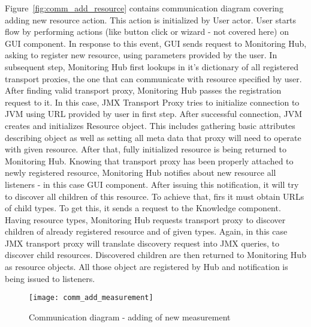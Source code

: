 Figure~\ref{fig:comm_add_resource} contains communication diagram covering adding new resource action. This action is
initialized by User actor. User starts flow by performing actions (like button click or wizard - not covered here) on
GUI component. In response to this event, GUI sends request to Monitoring Hub, asking to register new resource,
using parameters provided by the user. In subsequent step, Monitoring Hub first lookups in it's dictionary of all
registered transport proxies, the one that can communicate with resource specified by user. After finding valid
transport proxy, Monitoring Hub passes the registration request to it. In this case, JMX
Transport Proxy tries to initialize connection to JVM using URL provided by user in first step. After successful
connection, JVM creates and initializes Resource object. This includes gathering basic attributes describing object
as well as setting all meta data that proxy will need to operate with given resource. After that, fully initialized
resource is being returned to Monitoring Hub. Knowing that transport proxy has been properly attached to newly
registered resource, Monitoring Hub notifies about new resource all listeners - in this case GUI component. After
issuing this notification, it will try to discover all children of this resource. To achieve that, firs it must
obtain URLs of child types. To get this, it sends a request to the Knowledge component.
Having resource types, Monitoring Hub requests transport proxy to discover children of already registered resource and
of given types. Again, in this case JMX transport proxy will translate discovery request into JMX queries, to discover
child resources. Discovered children are then returned to Monitoring Hub as resource objects. All those object are
registered by Hub and notification is being issued to listeners.


\begin{figure}[h]
  \centering
  \texttt{[image: comm\_add\_measurement]}
  \caption{Communication diagram - adding of new measurement}
  \label{fig:comm_add_measurement}
\end{figure}

